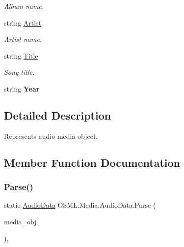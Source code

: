 \begin{DoxyCompactItemize}
\begin{DoxyCompactList}\small\item\em Album name. \end{DoxyCompactList}\item 
string \mbox{\hyperlink{classOSML_1_1Media_1_1AudioData_ab813e66823ae1c11c18be7d7ae7867b7}{Artist}}
\begin{DoxyCompactList}\small\item\em Artist name. \end{DoxyCompactList}\item 
string \mbox{\hyperlink{classOSML_1_1Media_1_1AudioData_a6ebba977a99229a0e940c49581bb6492}{Title}}
\begin{DoxyCompactList}\small\item\em Song title. \end{DoxyCompactList}\item 
\mbox{\label{classOSML_1_1Media_1_1AudioData_a2fd288214887d812713deccaa5ab0f09}} 
string {\bfseries Year}
\end{DoxyCompactItemize}


\subsection{Detailed Description}
Represents audio media object. 



\subsection{Member Function Documentation}
\mbox{\label{classOSML_1_1Media_1_1AudioData_a540e7ad195c5545350ae7260dc410fef}} 
\subsubsection{\texorpdfstring{Parse()}{Parse()}}
{\footnotesize\ttfamily static \mbox{\hyperlink{classOSML_1_1Media_1_1AudioData}{Audio\+Data}} O\+S\+M\+L.\+Media.\+Audio\+Data.\+Parse (\begin{DoxyParamCaption}\item[{\mbox{\hyperlink{classOSML_1_1Media_1_1MediaObj}{Media\+Obj}}}]{media\+\_\+obj }\end{DoxyParamCaption})\hspace{0.3cm}{\ttfamily [inline]}, {\ttfamily [static]}}



